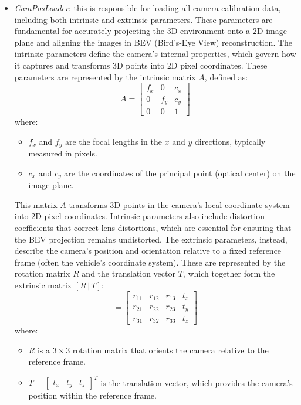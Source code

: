\begin{itemize}
    \item \textit{CamPosLoader}: this is responsible for loading all camera calibration data, including both intrinsic and extrinsic parameters. These parameters are fundamental for accurately projecting the 3D environment onto a 2D image plane and aligning the images in BEV (Bird's-Eye View) reconstruction.
    The intrinsic parameters define the camera’s internal properties, which govern how it captures and transforms 3D points into 2D pixel coordinates. These parameters are represented by the intrinsic matrix \( A \), defined as:
    \begin{equation}
        A = \begin{bmatrix}
        f_x & 0 & c_x \\ 
        0 & f_y & c_y \\ 
        0 & 0 & 1 
        \end{bmatrix}
    \end{equation}
    where:
    \begin{itemize}
        \item \( f_x \) and \( f_y \) are the focal lengths in the \( x \) and \( y \) directions, typically measured in pixels.
        \item \( c_x \) and \( c_y \) are the coordinates of the principal point (optical center) on the image plane.
    \end{itemize}
    This matrix \( A \) transforms 3D points in the camera’s local coordinate system into 2D pixel coordinates. Intrinsic parameters also include distortion coefficients that correct lens distortions, which are essential for ensuring that the BEV projection remains undistorted.
    The extrinsic parameters, instead, describe the camera's position and orientation relative to a fixed reference frame (often the vehicle's coordinate system). These are represented by the rotation matrix \( R \) and the translation vector \( T \), which together form the extrinsic matrix \( [R \,|\, T] \):
    \begin{equation}
        [R \,|\, T] = \begin{bmatrix}
        r_{11} & r_{12} & r_{13} & t_x \\ 
        r_{21} & r_{22} & r_{23} & t_y \\ 
        r_{31} & r_{32} & r_{33} & t_z 
        \end{bmatrix}
    \end{equation}
    where:
    \begin{itemize}
        \item \( R \) is a \( 3 \times 3 \) rotation matrix that orients the camera relative to the reference frame.
        \item \( T = \begin{bmatrix} t_x & t_y & t_z \end{bmatrix}^T \) is the translation vector, which provides the camera’s position within the reference frame.
    \end{itemize}
    

\end{itemize}
